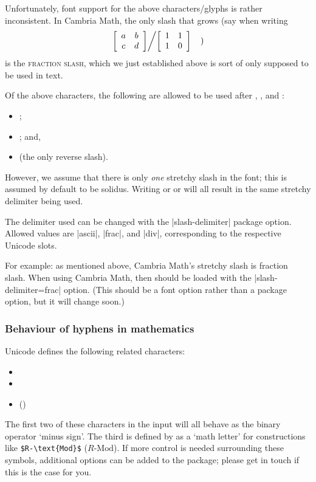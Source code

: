 Unfortunately, font support for the above characters/glyphs is rather inconsistent.
In Cambria Math, the only slash that grows (say when writing
\[
\left.\left[\begin{array}{cc} a & b \\ c & d\end{array}\right]\middle\slash
      \left[\begin{array}{cc} 1 & 1 \\ 1 & 0\end{array}\right] \right.\quad )
\]
is the \textsc{fraction slash}, which we just established above is
sort of only supposed to be used in text.

Of the above characters, the following are allowed to be used after
, , and :
\begin{itemize}
\item {};
\item {}; and,
\item {} (the only reverse slash).
\end{itemize}

However, we assume that there is only \emph{one} stretchy slash
in the font; this is assumed by default to be  {solidus}.
Writing  or  or 
will all result in the same stretchy delimiter being used.

The delimiter used can be changed with the |slash-delimiter| package option.
Allowed values are |ascii|, |frac|, and |div|, corresponding to the respective
Unicode slots.

For example: as mentioned above, Cambria Math's stretchy slash is
 {fraction slash}. When using Cambria Math, then
 should be loaded with the |slash-delimiter=frac| option.
(This should be a font option rather than a package option, but
it will change soon.)

\subsubsection{Behaviour of hyphens in mathematics}

Unicode defines the following related characters:
\begin{itemize}
\item {}
\item {}
\item {} ()
\end{itemize}
The first two of these characters in the input will all behave as the binary operator
`minus sign'.
The third is defined by  as a `math letter' for constructions
like \verb|$R‐\text{Mod}$| ($R‐\text{Mod}$).
If more control is needed surrounding these symbols, additional options can be added to the package;
please get in touch if this is the case for you.


